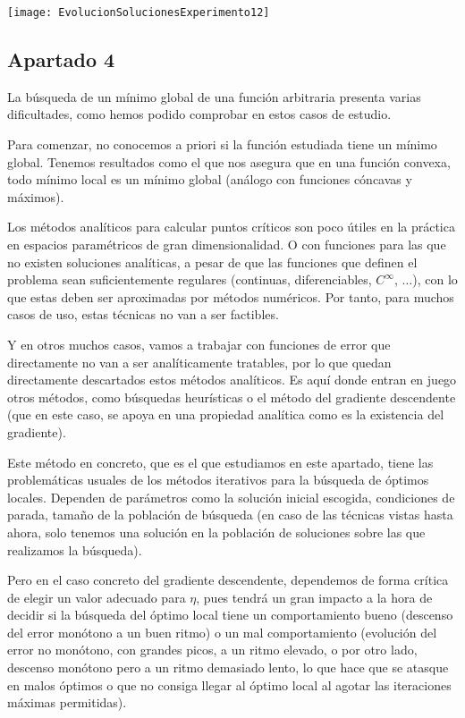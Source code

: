 \documentclass[11pt]{article}
\begin{document}
\texttt{[image: EvolucionSolucionesExperimento12]}

\pagebreak

\subsection{Apartado 4}

La búsqueda de un mínimo global de una función arbitraria presenta varias dificultades, como hemos podido comprobar en estos casos de estudio.

Para comenzar, no conocemos a priori si la función estudiada tiene un mínimo global. Tenemos resultados como el que nos asegura que en una función convexa, todo mínimo local es un mínimo global (análogo con funciones cóncavas y máximos).

Los métodos analíticos para calcular puntos críticos son poco útiles en la práctica en espacios paramétricos de gran dimensionalidad. O con funciones para las que no existen soluciones analíticas, a pesar de que las funciones que definen el problema sean suficientemente regulares (continuas, diferenciables, $C^\infty$, $\ldots$), con lo que estas deben ser aproximadas por métodos numéricos. Por tanto, para muchos casos de uso, estas técnicas no van a ser factibles.

Y en otros muchos casos, vamos a trabajar con funciones de error que directamente no van a ser analíticamente tratables, por lo que quedan directamente descartados estos métodos analíticos. Es aquí donde entran en juego otros métodos, como búsquedas heurísticas o el método del gradiente descendente (que en este caso, se apoya en una propiedad analítica como es la existencia del gradiente).

Este método en concreto, que es el que estudiamos en este apartado, tiene las problemáticas usuales de los métodos iterativos para la búsqueda de óptimos locales. Dependen de parámetros como la solución inicial escogida, condiciones de parada, tamaño de la población de búsqueda (en caso de las técnicas vistas hasta ahora, solo tenemos una solución en la población de soluciones sobre las que realizamos la búsqueda).

Pero en el caso concreto del gradiente descendente, dependemos de forma crítica de elegir un valor adecuado para $\eta$, pues tendrá un gran impacto a la hora de decidir si la búsqueda del óptimo local tiene un comportamiento bueno (descenso del error monótono a un buen ritmo) o un mal comportamiento (evolución del error no monótono, con grandes picos, a un ritmo elevado, o por otro lado, descenso monótono pero a un ritmo demasiado lento, lo que hace que se atasque en malos óptimos o que no consiga llegar al óptimo local al agotar las iteraciones máximas permitidas).
\end{document}

